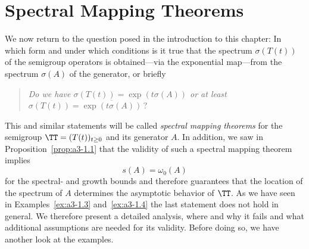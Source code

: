 \section{Spectral Mapping Theorems}\label{sec:a3-6}%
We now return to the question posed in the introduction to this chapter: In which form and under which conditions is it true that the spectrum $\sigma(T(t))$ of the semigroup operators is obtained---via the exponential map---from the spectrum $\sigma(A)$ of the generator, or briefly
\begin{quote}\emph{
Do we have  $\sigma(T(t)) = \exp(t \sigma(A) )$  or at least 
 $\sigma(T(t)) = \overline{\exp(t\sigma(A))}$}\,?
\end{quote}
This and similar statements will be called \emph{spectral mapping theorems} for the semigroup $\TT = (T(t))_{t \geq 0}$ and its generator $A$.
In addition, we saw in Proposition~\ref{prop:a3-1.1} that the validity of such a spectral mapping theorem implies
\[
s(A) = \omega_{0}(A)
\]
for the spectral- and growth bounds and therefore guarantees that the location of the spectrum of\/ $A$ determines the asymptotic behavior of\/ $\TT$. 
As we have seen in Examples~\ref{ex:a3-1.3} and~\ref{ex:a3-1.4} the last statement does not hold in general.
We therefore present a detailed analysis, where and why it fails and what additional assumptions are needed for its validity.
Before doing so, we have another look at the examples.

